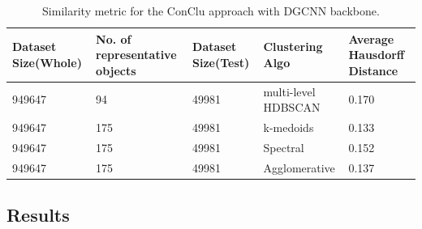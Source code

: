 \begin{table}[H]
  \setlength\extrarowheight{10pt}
  \caption{Similarity metric for the ConClu approach with \ac{DGCNN} backbone.}
  \centering
  \begin{tabular}{|p{50pt}|p{50pt}|p{50pt}|p{60pt}|p{40pt}|}
    \toprule
    Dataset Size(Whole)	& No. of  representative objects	& Dataset Size(Test)	& Clustering Algo	& Average Hausdorff Distance\\
    \midrule
    949647	& 94	& 49981	& multi-level \ac{HDBSCAN} &  0.170 \\ \cline{1-5} 
    949647	& 175	& 49981	& k-medoids	& 0.133 \\ \cline{1-5}
    949647	& 175	& 49981	& Spectral	&	0.152  \\ \cline{1-5}
    949647	& 175	& 49981	& Agglomerative	& 0.137 \\   
    \bottomrule
  \end{tabular}
  \label{tab:dgcnn_sim}
\end{table}

\subsection{Results}

